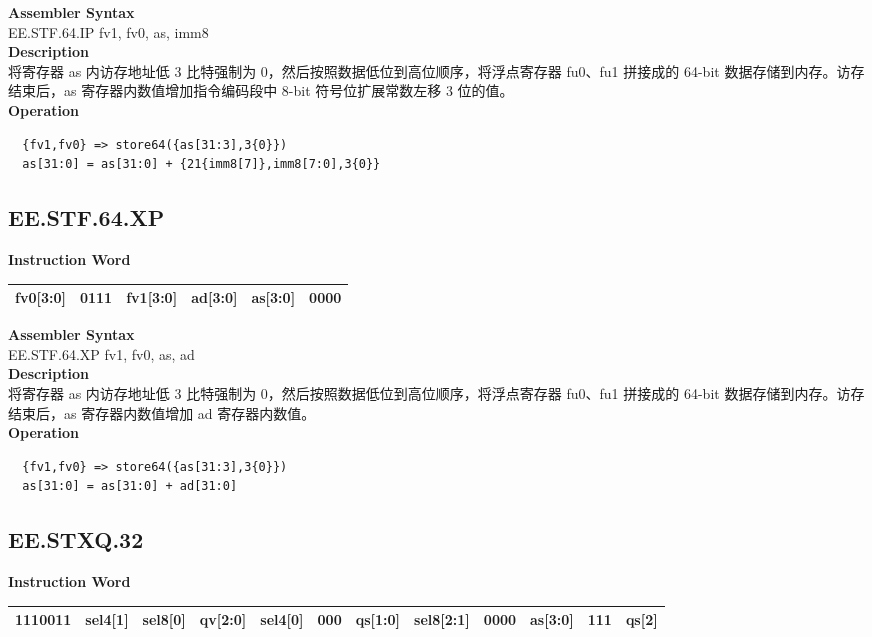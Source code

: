 \textbf{Assembler Syntax} \\
EE.STF.64.IP fv1, fv0, as, imm8 \\
\textbf{Description} \\
将寄存器 as 内访存地址低 3 比特强制为 0，然后按照数据低位到高位顺序，将浮点寄存器 fu0、fu1 拼接成的 64-bit 数据存储到内存。访存结束后，as 寄存器内数值增加指令编码段中 8-bit 符号位扩展常数左移 3 位的值。\\
\textbf{Operation}
\begin{lstlisting}
  {fv1,fv0} => store64({as[31:3],3{0}})
  as[31:0] = as[31:0] + {21{imm8[7]},imm8[7:0],3{0}}
\end{lstlisting}

\clearpage
\subsection{EE.STF.64.XP}\label{instruction:EESTF64XP}
\setlength\tabcolsep{6pt}
\textbf{Instruction Word} \\
\begin{tabular}{|c|c|c|c|c|c|}
	\hline
	fv0[3:0] & 0111 & fv1[3:0] & ad[3:0] & as[3:0] & 0000 \\
	\hline
\end{tabular}

\textbf{Assembler Syntax} \\
EE.STF.64.XP fv1, fv0, as, ad \\
\textbf{Description} \\
将寄存器 as 内访存地址低 3 比特强制为 0，然后按照数据低位到高位顺序，将浮点寄存器 fu0、fu1 拼接成的 64-bit 数据存储到内存。访存结束后，as 寄存器内数值增加 ad 寄存器内数值。\\
\textbf{Operation}
\begin{lstlisting}
  {fv1,fv0} => store64({as[31:3],3{0}})
  as[31:0] = as[31:0] + ad[31:0]
\end{lstlisting}

\clearpage
\subsection{EE.STXQ.32}\label{instruction:EESTXQ32}
\setlength\tabcolsep{6pt}
\textbf{Instruction Word} \\
\begin{tabular}{|c|c|c|c|c|c|c|c|c|c|c|c|}
	\hline
	1110011 & sel4[1] & sel8[0] & qv[2:0] & sel4[0] & 000 & qs[1:0] & sel8[2:1] & 0000 & as[3:0] & 111 & qs[2] \\
	\hline
\end{tabular}

